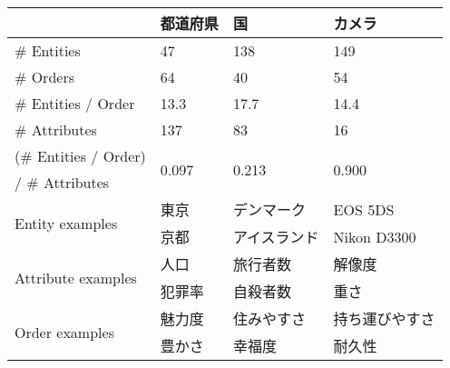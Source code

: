 \begin{tabular}{l p{5em} p{5em} p{5em}}
\toprule
&都道府県&国&カメラ\\
\midrule
\# Entities&47&138&149\\
\# Orders&64&40&54\\
\# Entities / Order&13.3&17.7&14.4\\
\# Attributes&137&83&16\\
(\# Entities / Order)&\multirow{2}{*}{0.097}&\multirow{2}{*}{0.213}&\multirow{2}{*}{0.900}\\
\hspace{1em}/ \# Attributes&\\
\midrule
\multirow{2}{*}{Entity examples}&\multicolumn{1}{l}{東京}&\multicolumn{1}{l}{デンマーク}&\multicolumn{1}{l}{EOS 5DS}\\
&\multicolumn{1}{l}{京都}&\multicolumn{1}{l}{アイスランド}&\multicolumn{1}{l}{Nikon D3300}\\
\midrule
\multirow{2}{*}{Attribute examples}&\multicolumn{1}{l}{人口}&\multicolumn{1}{l}{旅行者数}&\multicolumn{1}{l}{解像度}\\
&\multicolumn{1}{l}{犯罪率}&\multicolumn{1}{l}{自殺者数}&\multicolumn{1}{l}{重さ}\\
\midrule
\multirow{2}{*}{Order examples}&\multicolumn{1}{l}{魅力度}&\multicolumn{1}{l}{住みやすさ}&\multicolumn{1}{l}{持ち運びやすさ}\\
&\multicolumn{1}{l}{豊かさ}&\multicolumn{1}{l}{幸福度}&\multicolumn{1}{l}{耐久性}\\
\bottomrule
\end{tabular}
